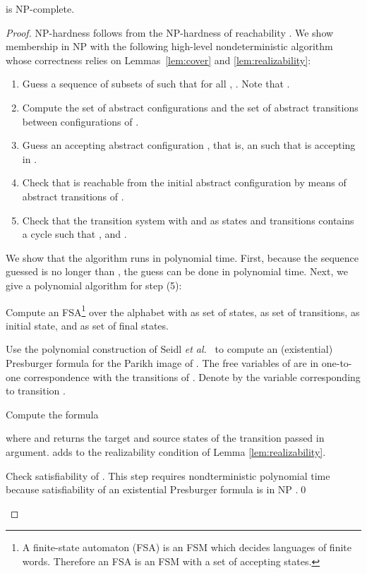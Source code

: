 \documentclass{llncs}
\begin{document}
\begin{theorem}
\label{th:fsafsa}
 is NP-complete.
\end{theorem}
\begin{proof}
NP-hardness
follows from the NP-hardness of reachability \cite{egm13}.
We show membership in NP with the following high-level 
nondeterministic algorithm whose correctness 
relies on Lemmas~\ref{lem:cover} and \ref{lem:realizability}:
\begin{enumerate}
	\item Guess a sequence  of subsets of  such that  for all , . Note that .
	\item Compute the set  of abstract configurations and the set  of abstract transitions 
	      between configurations of .
	\item Guess an accepting abstract configuration , that is, an
  such that  is accepting in .
	\item Check that  is reachable from the initial abstract configuration  by means of abstract transitions of . 
	\item Check that the transition system with  and 
as states and transitions contains a cycle 
such that ,  and .
\end{enumerate}
We show that the algorithm runs in polynomial time. First, because the sequence guessed is no longer 
than , the guess can be done in polynomial time. 
Next, we give a polynomial algorithm for step (5):
\begin{compactitem}
\item Compute an FSA\footnote{A finite-state automaton (FSA) is an FSM which decides languages of finite words. Therefore an FSA is an FSM with a set  of accepting states.}  over the alphabet
		 with  as set of states,
		 as set of transitions,  as initial state, and  
                 as set of final states.
	\item Use the polynomial construction of Seidl \textit{et al.}~\cite{Seidl05} to compute an (existential) Presburger formula  for the Parikh
		image of . 
		The free variables of  are in one-to-one correspondence with the transitions of . Denote by 
		the variable corresponding to transition .
	\item Compute the formula 
		{
\setlength\abovedisplayskip{1pt}
\setlength\belowdisplayskip{1pt}
		
		}
\noindent where  and  returns the target and source states of the transition passed in argument.  adds to  the realizability condition of Lemma \ref{lem:realizability}.
	\item Check satisfiability of . This step requires nondterministic polynomial 
              time because satisfiability of an existential Presburger formula is in NP \cite{Gradel88}.\qed
\end{compactitem}
\end{proof}
\end{document}
